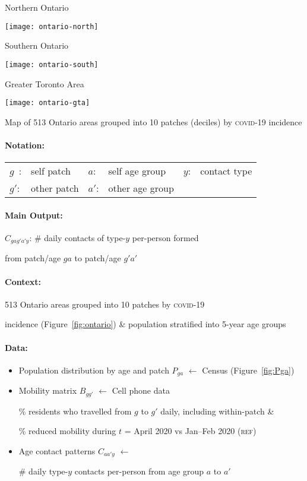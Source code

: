 \begin{fig}{\linewidth}\unskip
  \newcommand{\greytitle}[1]{\centering\footnotesize{\color{black!40!white}#1}\bigskip\par}
  \begin{minipage}[t]{0.30\linewidth}
    \greytitle{Northern Ontario}
    \texttt{[image: ontario-north]}
  \end{minipage}\hfill%
  \begin{minipage}[t]{0.32\linewidth}
    \greytitle{Southern Ontario}
    \texttt{[image: ontario-south]}
  \end{minipage}%
  \begin{minipage}[t]{0.36\linewidth}
    \greytitle{Greater Toronto Area}
    \texttt{[image: ontario-gta]}
  \end{minipage}
  \caption{Map of 513 Ontario areas grouped into 10 patches (deciles)
    by \textsc{covid-19} incidence}
  \label{fig:ontario}
\end{fig}
\medskip\par
\paragraph{Notation:}
\begin{tabular}[t]{llllll}
  $g$~: & self patch  & $a$:  & self age group  & $y$: & contact type \\
  $g'$: & other patch & $a'$: & other age group &      &
\end{tabular}
\paragraph{Main Output:} $C_{gag'a'y}$: \# daily contacts of type-$y$ per-person formed
\par\indent from patch/age $ga$ to patch/age $g'a'$
\paragraph{Context:}
513 Ontario areas grouped into 10 patches by \textsc{covid-19}
\par\indent incidence (Figure~\ref{fig:ontario}) \& population stratified into 5-year age groups
\paragraph{Data:}
\begin{itemize}
  \item Population distribution by age and patch $P_{ga}$ $\leftarrow$ Census \cite{StatsCan2016} (Figure~\ref{fig:Pga})
  \item Mobility matrix $B_{gg'}$ $\leftarrow$ Cell phone data \cite{Ghasemi2021}\par
  \% residents who travelled from $g$ to $g'$ daily, including within-patch \&\par
  \% reduced mobility during $t$ = April 2020 vs Jan--Feb 2020 (\textsc{ref})
  \item Age contact patterns $C_{aa'y}$ $\leftarrow$ \citet{Prem2021}\par
  \# daily type-$y$ contacts per-person from age group $a$ to $a'$
\end{itemize}